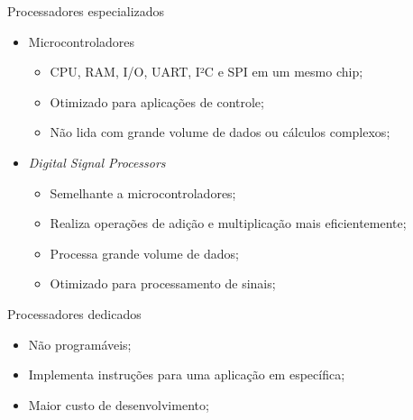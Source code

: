 \begin{frame}{Processadores especializados}

    \begin{itemize}
        \item Microcontroladores
            
            \begin{itemize}
                \item CPU, RAM, I/O, UART, I²C e SPI em um mesmo chip;
                \item Otimizado para aplicações de controle;
                \item Não lida com grande volume de dados ou cálculos complexos;
            \end{itemize}
            
        \item \textit{Digital Signal Processors}
            
            \begin{itemize}
                \item Semelhante a microcontroladores;
                \item Realiza operações de adição e multiplicação mais eficientemente;
                \item Processa grande volume de dados;
                \item Otimizado para processamento de sinais;
            \end{itemize}
            
    \end{itemize}

    
\end{frame}




\begin{frame}{Processadores dedicados}

\begin{itemize}
    \item Não programáveis;
    \item Implementa instruções para uma aplicação em específica;
    \item Maior custo de desenvolvimento;
\end{itemize}

\end{frame}


